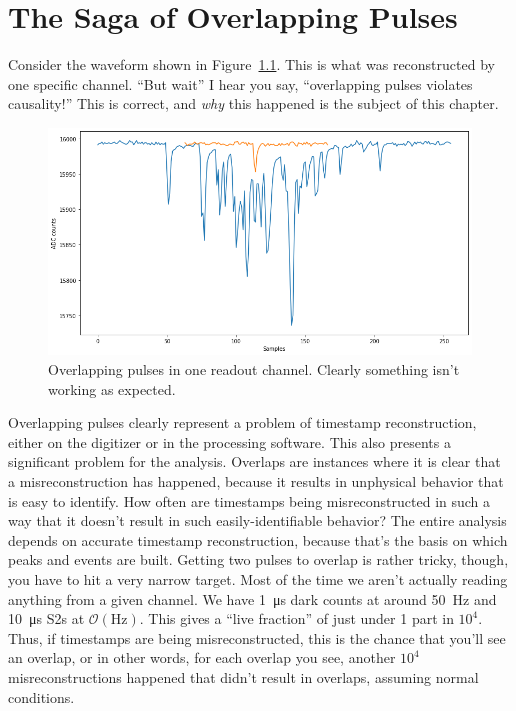 \chapter{The Saga of Overlapping Pulses}

Consider the waveform shown in Figure~\ref{fig:overlap}.
This is what was reconstructed by one specific channel.
``But wait'' I hear you say, ``overlapping pulses violates causality!''
This is correct, and \emph{why} this happened is the subject of this chapter.

\begin{figure}[htb]
  \includegraphics[width=\textwidth]{images/overlap_pulse}
  \caption{Overlapping pulses in one readout channel. Clearly something isn't working as expected.}\label{fig:overlap}
\end{figure}

Overlapping pulses clearly represent a problem of timestamp reconstruction, either on the digitizer or in the processing software.
This also presents a significant problem for the analysis.
Overlaps are instances where it is clear that a misreconstruction has happened, because it results in unphysical behavior that is easy to identify.
How often are timestamps being misreconstructed in such a way that it doesn't result in such easily-identifiable behavior?
The entire analysis depends on accurate timestamp reconstruction, because that's the basis on which peaks and events are built.
Getting two pulses to overlap is rather tricky, though, you have to hit a very narrow target.
Most of the time we aren't actually reading anything from a given channel.
We have \SI{1}{\micro\second} dark counts at around \SI{50}{\hertz} and \SI{10}{\micro\second} S2s at $\mathcal{O}(\mathrm{Hz})$.
This gives a ``live fraction'' of just under 1 part in $10^4$.
Thus, if timestamps are being misreconstructed, this is the chance that you'll see an overlap, or in other words, for each overlap you see, another $10^4$ misreconstructions happened that didn't result in overlaps, assuming normal conditions.

